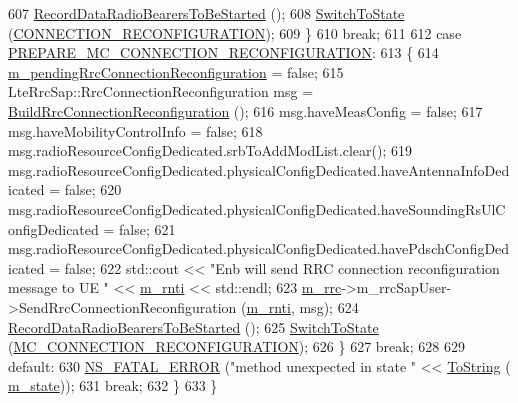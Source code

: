 \begin{DoxyCode}
607         \hyperlink{classns3_1_1UeManager_a104d92b26b4b7fe93099d74080f62ae3}{RecordDataRadioBearersToBeStarted} ();
608         \hyperlink{classns3_1_1UeManager_af2b5ad90fc6f16ffc4a91fbe8a522472}{SwitchToState} (\hyperlink{classns3_1_1UeManager_a2f4085fdd18d7125c27da44a5b8b6808abd13cee86acc2cb3c04241dec919c73f}{CONNECTION\_RECONFIGURATION});
609       \}
610       \textcolor{keywordflow}{break};
611 
612     \textcolor{keywordflow}{case} \hyperlink{classns3_1_1UeManager_a2f4085fdd18d7125c27da44a5b8b6808aca9c82460eb5d1d8fcebbfc0c4a9167b}{PREPARE\_MC\_CONNECTION\_RECONFIGURATION}:
613       \{
614         \hyperlink{classns3_1_1UeManager_ac1e5bf47aad07288d2676bb09e63e215}{m\_pendingRrcConnectionReconfiguration} = \textcolor{keyword}{false};
615         LteRrcSap::RrcConnectionReconfiguration msg = 
      \hyperlink{classns3_1_1UeManager_a41bd82649d9703e339e3fe988f922a5f}{BuildRrcConnectionReconfiguration} ();
616         msg.haveMeasConfig = \textcolor{keyword}{false};
617         msg.haveMobilityControlInfo = \textcolor{keyword}{false};
618         msg.radioResourceConfigDedicated.srbToAddModList.clear();
619         msg.radioResourceConfigDedicated.physicalConfigDedicated.haveAntennaInfoDedicated = \textcolor{keyword}{false};
620         msg.radioResourceConfigDedicated.physicalConfigDedicated.haveSoundingRsUlConfigDedicated = \textcolor{keyword}{false};
621         msg.radioResourceConfigDedicated.physicalConfigDedicated.havePdschConfigDedicated = \textcolor{keyword}{false};
622        std::cout << \textcolor{stringliteral}{"Enb will send RRC connection reconfiguration message to UE "} <<
      \hyperlink{classns3_1_1UeManager_a5a72b4fe818f21993bd7f05d7e2c4f83}{m\_rnti} << std::endl;
623         \hyperlink{classns3_1_1UeManager_ab4405e9f354c66e7c1a4c95832290f5b}{m\_rrc}->m\_rrcSapUser->SendRrcConnectionReconfiguration (\hyperlink{classns3_1_1UeManager_a5a72b4fe818f21993bd7f05d7e2c4f83}{m\_rnti}, msg);
624         \hyperlink{classns3_1_1UeManager_a104d92b26b4b7fe93099d74080f62ae3}{RecordDataRadioBearersToBeStarted} ();
625         \hyperlink{classns3_1_1UeManager_af2b5ad90fc6f16ffc4a91fbe8a522472}{SwitchToState} (\hyperlink{classns3_1_1UeManager_a2f4085fdd18d7125c27da44a5b8b6808a263ff177d041c66b6a07b69e2be5562e}{MC\_CONNECTION\_RECONFIGURATION});
626       \}
627       \textcolor{keywordflow}{break};
628 
629     \textcolor{keywordflow}{default}:
630       \hyperlink{group__fatal_ga5131d5e3f75d7d4cbfd706ac456fdc85}{NS\_FATAL\_ERROR} (\textcolor{stringliteral}{"method unexpected in state "} << \hyperlink{namespacens3_a3d1f7e1bec1972e2ae8d64673fcfcd9c}{ToString} (
      \hyperlink{classns3_1_1UeManager_aaed4b2490297cb912e743084f1a27b08}{m\_state}));
631       \textcolor{keywordflow}{break};
632     \}
633 \}
\end{DoxyCode}


